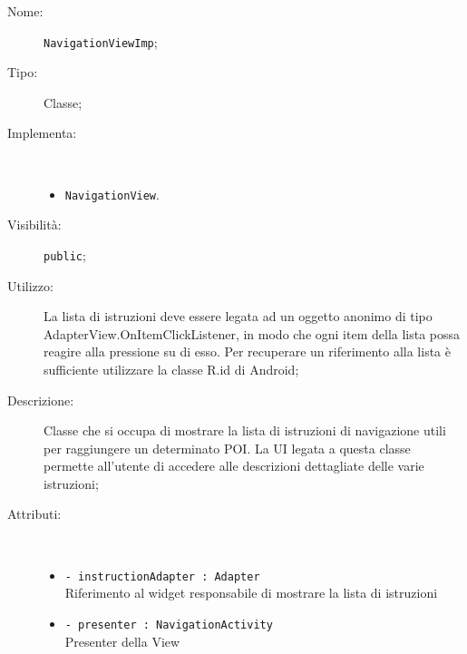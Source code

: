 \documentclass[../DefinizioneDiProdotto.tex]{subfiles}
\begin{document}
\begin{description}
	\item[Nome:] \texttt{NavigationViewImp};
	\item[Tipo:] Classe;
	\item[Implementa:] \
	\begin{itemize}
		\item \texttt{NavigationView}.
		
	\end{itemize}
	\item[Visibilità:] \texttt{public};
	\item[Utilizzo:] La lista di istruzioni deve essere legata ad un oggetto anonimo di tipo AdapterView.OnItemClickListener, in modo che ogni item della lista possa reagire alla pressione su di esso. Per recuperare un riferimento alla lista è sufficiente utilizzare la classe R.id di Android;
	\item[Descrizione:] Classe che si occupa di mostrare la lista di istruzioni di navigazione utili per raggiungere un determinato POI. La UI legata a questa classe permette all'utente di accedere alle descrizioni dettagliate delle varie istruzioni;
	\item[Attributi:] \
	\begin{itemize}
		\item \texttt{- instructionAdapter : Adapter}\\
		Riferimento al widget responsabile di mostrare la lista di istruzioni
		
		\item \texttt{- presenter : NavigationActivity}\\
		Presenter della View
		

\end{itemize}
\end{description}
\end{document}
